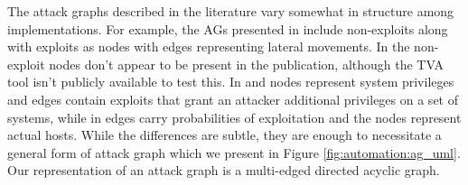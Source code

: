 The attack graphs described in the literature vary somewhat in structure among implementations. For example, the AGs presented in \cite{Ou_Appel_2005} include non-exploits along with exploits as nodes with edges representing lateral movements. In \cite{Noel_Jajodia_2014} the non-exploit nodes don't appear to be present in the publication, although the TVA tool isn't publicly available to test this. In \cite{Dacier_1994} and \cite{Ortalo_1999} nodes represent system privileges and edges contain exploits that grant an attacker additional privileges on a set of systems, while in \cite{Phillips_Swiler_1998} edges carry probabilities of exploitation and the nodes represent actual hosts. While the differences are subtle, they are enough to necessitate a general form of attack graph which we present in Figure \ref{fig:automation:ag_uml}. Our representation of an attack graph is a multi-edged directed acyclic graph.     

